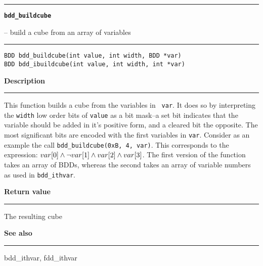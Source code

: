 \vspace{8ex}
\begin{minipage}{\textwidth}

\noindent\begin{minipage}{\textwidth}
\rule{\textwidth}{0.5mm}
{\tt\bf bdd\_buildcube }
\--- build a cube from an array of variables  \hspace{\fill}
\\\rule[1.5ex]{\textwidth}{0.5mm}
\end{minipage}

\noindent\begin{verbatim}
BDD bdd_buildcube(int value, int width, BDD *var)
BDD bdd_ibuildcube(int value, int width, int *var)
\end{verbatim}

\vspace{\parsep}\noindent
{\bf Description}\\\rule[1.5ex]{\textwidth}{0.2mm}\vspace{-1.5ex}\setlength{\parindent}{1em}
This function builds a cube from the variables in {\tt
           var}. It does so by interpreting the {\tt width} low order
	   bits of {\tt value} as a bit mask--a set bit indicates that the
	   variable should be added in it's positive form, and a cleared
	   bit the opposite. The most significant bits are encoded with
	   the first variables in {\tt var}. Consider as an example
	   the call {\tt bdd\_buildcube(0xB, 4, var)}. This corresponds
	   to the expression: $var[0] \wedge \neg var[1] \wedge var[2]
	   \wedge var[3]$. The first version of the function takes an array
	   of BDDs, whereas the second takes an array of variable numbers
	   as used in {\tt bdd\_ithvar}. 

\setlength{\parindent}{0em}\vspace{\parsep}\vspace{\baselineskip}\noindent
{\bf Return value}\\\rule[1.5ex]{\textwidth}{0.2mm}\vspace{-1.5ex}
The resulting cube 

\vspace{\parsep}\vspace{\baselineskip}\noindent
{\bf See also}\\\rule[1.5ex]{\textwidth}{0.2mm}\vspace{-1.5ex}
bdd\_ithvar, fdd\_ithvar 
\end{minipage}
